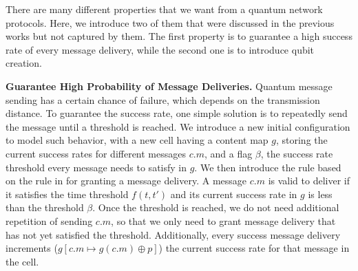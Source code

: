 There are many different properties that we want from a quantum network protocols.
Here, we introduce two of them that were discussed in the previous works but not captured by them. 
The first property is to guarantee a high success rate of every message delivery,
while the second one is to introduce qubit creation. 

\noindent\textbf{Guarantee High Probability of Message Deliveries.}
Quantum message sending has a certain chance of failure, which depends on the transmission distance.
To guarantee the success rate, one simple solution is to repeatedly send the message until a threshold is reached.
We introduce a new initial configuration  to model such behavior,
with a new cell  having a content map $g$, storing the current success rates for different messages $c.m$, and a flag $\beta$, the success rate threshold every message needs to satisfy in $g$.
We then introduce the  rule based on the  rule in 
for granting a message delivery.
A message $c.m$ is valid to deliver if it satisfies the time threshold $f(t,t')$
and its current success rate in $g$ is less than the threshold $\beta$.
Once the threshold is reached, we do not need additional repetition of sending $c.m$, so that we only need to grant message delivery that has not yet satisfied the threshold.
Additionally, every success message delivery increments ($g[c.m\mapsto g(c.m)\oplus p]$) the current success rate for that message in the  cell.

